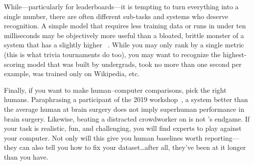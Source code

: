While---particularly for leaderboards---it is tempting to turn everything into a single number, there are often different sub-tasks and systems who deserve recognition.
A simple model that requires less training data or runs in under ten milliseconds may be objectively more useful than a bloated, brittle monster of a system that has a slightly higher \fone{}~\cite{dodge-19}. 
While you may only rank by a single metric (this is what trivia tournaments do too), you may want to recognize the highest-scoring model that was built by undergrads, took no more than one second per example, was trained only on Wikipedia, etc.

Finally, if you want to make human--computer comparisons, pick the right humans.  Paraphrasing
a participant of the 2019  workshop~\cite{fisch-19}, a system better than the average human at brain surgery does not imply superhuman performance in brain surgery.  
Likewise, beating a distracted crowdworker on  is not 's endgame.  
If your task is realistic, fun, and challenging, you will find experts to play against your computer.
Not only will this give you human baselines worth reporting---they can also tell you how to fix your  dataset\dots after all, they've been at it longer than you have.
